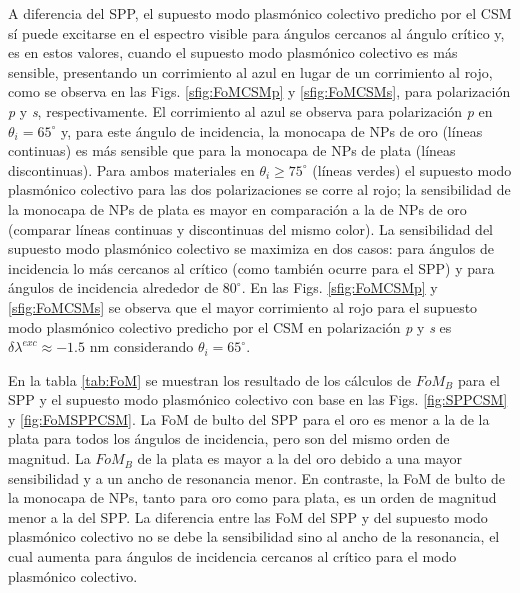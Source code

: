 A diferencia del SPP, el supuesto modo  plasmónico colectivo predicho por el CSM sí puede excitarse en el espectro visible para ángulos cercanos al ángulo crítico y, es en estos valores, cuando el supuesto modo  plasmónico colectivo es más sensible, presentando un corrimiento al azul en lugar de un corrimiento al rojo, como se observa en las Figs. \ref{sfig:FoMCSMp} y \ref{sfig:FoMCSMs}, para polarización \emph{p} y \emph{s}, respectivamente. El corrimiento al azul se observa para polarización \emph{p} en $\theta_i=65^\circ$ y, para este ángulo de incidencia, la monocapa de NPs de oro (líneas continuas) es más sensible que para la monocapa de NPs de plata (líneas discontinuas). Para ambos materiales en $\theta_i\geq 75^\circ$ (líneas verdes) el supuesto modo  plasmónico colectivo  para las dos polarizaciones se corre al rojo; la sensibilidad de la monocapa de NPs de plata es mayor en comparación a la de NPs de oro (comparar líneas continuas y discontinuas del mismo color). La sensibilidad del supuesto modo  plasmónico colectivo se maximiza en dos casos: para ángulos de incidencia lo más cercanos al crítico (como también ocurre para el SPP)  y para ángulos de incidencia alrededor de $80^\circ$.   En las Figs. \ref{sfig:FoMCSMp} y \ref{sfig:FoMCSMs} se observa que el mayor corrimiento al rojo para el supuesto modo  plasmónico colectivo predicho por el CSM en polarización \emph{p} y \emph{s} es $\delta\lambda^{exc} \approx -1.5$ nm considerando $\theta_i=65^\circ$.

En la tabla \ref{tab:FoM} se muestran los resultado de los cálculos de $\textit{FoM}_B$ para el SPP y el supuesto modo  plasmónico colectivo con base en las Figs. \ref{fig:SPPCSM} y \ref{fig:FoMSPPCSM}. La FoM de bulto del SPP para el oro es menor a la de la plata para todos los ángulos de incidencia,  pero son del mismo orden de magnitud. La $\textit{FoM}_B$ de la plata es mayor a la del oro debido a una mayor sensibilidad y a un ancho de resonancia menor. En contraste, la FoM de bulto de la monocapa de NPs, tanto para oro como para plata, es un orden de magnitud menor a la del SPP. La diferencia entre las FoM del SPP y del supuesto modo plasmónico colectivo no se debe  la sensibilidad sino al ancho de la resonancia, el cual aumenta para ángulos de incidencia cercanos al crítico para el  modo plasmónico colectivo.

